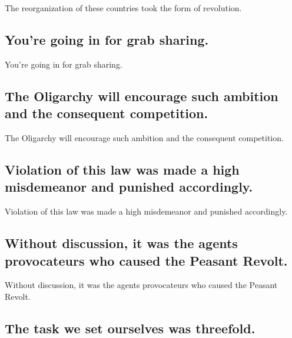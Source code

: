 \documentclass[]{article}
\begin{document}
The reorganization of these countries took the form of revolution.

\hypertarget{youre-going-in-for-grab-sharing.}{%
\subsection{You're going in for grab
sharing.}\label{youre-going-in-for-grab-sharing.}}

You're going in for grab sharing.

\hypertarget{the-oligarchy-will-encourage-such-ambition-and-the-consequent-competition.}{%
\subsection{The Oligarchy will encourage such ambition and the
consequent
competition.}\label{the-oligarchy-will-encourage-such-ambition-and-the-consequent-competition.}}

The Oligarchy will encourage such ambition and the consequent
competition.

\hypertarget{violation-of-this-law-was-made-a-high-misdemeanor-and-punished-accordingly.}{%
\subsection{Violation of this law was made a high misdemeanor and
punished
accordingly.}\label{violation-of-this-law-was-made-a-high-misdemeanor-and-punished-accordingly.}}

Violation of this law was made a high misdemeanor and punished
accordingly.

\hypertarget{without-discussion-it-was-the-agents-provocateurs-who-caused-the-peasant-revolt.}{%
\subsection{Without discussion, it was the agents provocateurs who
caused the Peasant
Revolt.}\label{without-discussion-it-was-the-agents-provocateurs-who-caused-the-peasant-revolt.}}

Without discussion, it was the agents provocateurs who caused the
Peasant Revolt.

\hypertarget{the-task-we-set-ourselves-was-threefold.}{%
\subsection{The task we set ourselves was
threefold.}\label{the-task-we-set-ourselves-was-threefold.}}
\end{document}
